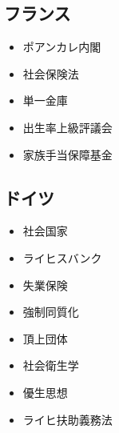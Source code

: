 \documentclass{jsarticle}
\begin{document}
\subsection{フランス}
\begin{itemize}
	\item ポアンカレ内閣
	\item 社会保険法
	\item 単一金庫
	\item 出生率上級評議会
	\item 家族手当保障基金
\end{itemize}

\subsection{ドイツ}
\begin{itemize}
	\item 社会国家
	\item ライヒスバンク
	\item 失業保険
	\item 強制同質化
	\item 頂上団体
	\item 社会衛生学
	\item 優生思想
	\item ライヒ扶助義務法
\end{itemize}
\end{document}
